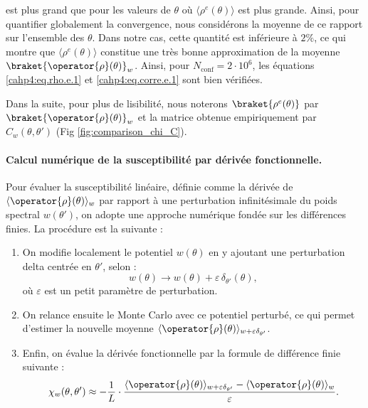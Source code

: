 est plus grand que pour les valeurs de \(\theta\) où \(\langle \rho^e(\theta) \rangle\) est plus grande. 
Ainsi, pour quantifier globalement la convergence, nous considérons la moyenne de ce rapport sur l’ensemble des \(\theta\). 
Dans notre cas, cette quantité est inférieure à \(2\%\), ce qui montre que \(\langle \rho^e(\theta) \rangle\) constitue une très bonne approximation de la moyenne \(\braket{\operator{\rho}(\theta)}_w\). Ainsi, pour \( N_{\text{conf}} = 2\cdot 10^6 \), les équations \eqref{cahp4:eq.rho.e.1} et \eqref{cahp4:eq.corre.e.1} sont bien vérifiées. 

\smallskip

Dans la suite, pour plus de lisibilité, nous noterons \(\braket{\rho^e(\theta)}\) par \(\braket{\operator{\rho}(\theta)}_w\) et la matrice obtenue empiriquement par \(C_w(\theta, \theta')\) (Fig \ref{fig:comparison_chi_C}).


\medskip


\paragraph{Calcul numérique de la susceptibilité par dérivée fonctionnelle.}

Pour évaluer la susceptibilité linéaire, définie comme la dérivée de \( \langle \operator{\rho}(\theta) \rangle_w \) par rapport à une perturbation infinitésimale du poids spectral \( w(\theta') \), on adopte une approche numérique fondée sur les différences finies. La procédure est la suivante :
\begin{enumerate}
    \item On modifie localement le potentiel \( w(\theta) \) en y ajoutant une perturbation delta centrée en \( \theta' \), selon :
    \begin{equation}
    	w(\theta) \rightarrow w(\theta) + \varepsilon\, \delta_{\theta'}(\theta),
   	\end{equation}
    où \( \varepsilon \) est un petit paramètre de perturbation.
    
    \item On relance ensuite le Monte Carlo avec ce potentiel perturbé, ce qui permet d’estimer la nouvelle moyenne \( \langle \operator{\rho}(\theta) \rangle_{w + \varepsilon \delta_{\theta'}} \).
    
    \item Enfin, on évalue la dérivée fonctionnelle par la formule de différence finie suivante :
    \begin{equation}\label{cahp4:eq.sus.e.1}
    	\chi_w(\theta, \theta')  \approx -\frac{1}{L} \cdot \frac{ \langle \operator{\rho}(\theta) \rangle_{w + \varepsilon \delta_{\theta'}} -  \langle\operator{\rho} (\theta) \rangle_w }{ \varepsilon }.
    \end{equation}
\end{enumerate}

